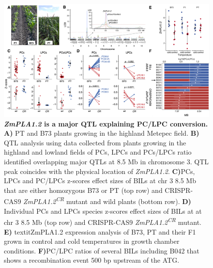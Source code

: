 \documentclass[9pt,twocolumn,twoside,lineno]{BioRxiv}
\begin{document}
\begin{figure}[!ht]
\begin{center}
\includegraphics[width=0.8\paperwidth]{Figures/Fig_3.png}
\caption{\textbf{\textit{ZmPLA1.2} is a major QTL explaining PC/LPC conversion.} 
\textbf{A)} PT and B73 plants growing in the highland Metepec field. 
\textbf{B)} QTL analysis using data collected from plants growing in the highland and lowland fields of PCs, LPCs and PCs/LPCs ratio identified overlapping major QTLs at 8.5 Mb in chromosome 3. 
QTL peak coincides with the physical location of \textit{ZmPLA1.2}. 
\textbf{C)}PCs, LPCs and PC/LPCs z-scores effect sizes of BILs at chr 3 8.5 Mb that are either homozygous B73 or PT (top row) and CRISPR-CAS9 \textit{ZmPLA1.2\textsuperscript{CR}} mutant and wild plants (bottom row).        
\textbf{D)} Individual PCs and LPCs species z-scores effect sizes of BILs at at chr 3 8.5 Mb (top row) and CRISPR-CAS9 \textit{ZmPLA1.2\textsuperscript{CR}} mutant.
\textbf{E)} textit{ZmPLA1.2} expression analysis of B73, PT and their F1 grown in control and cold temperatures in growth chamber conditions.
\textbf{F)}PC/LPC ratios of several BILs including B042 that shows a recombination event 500 bp upstream of the ATG.}
\label{Fig3}
\end{center}
\end{figure} 
\end{document}
